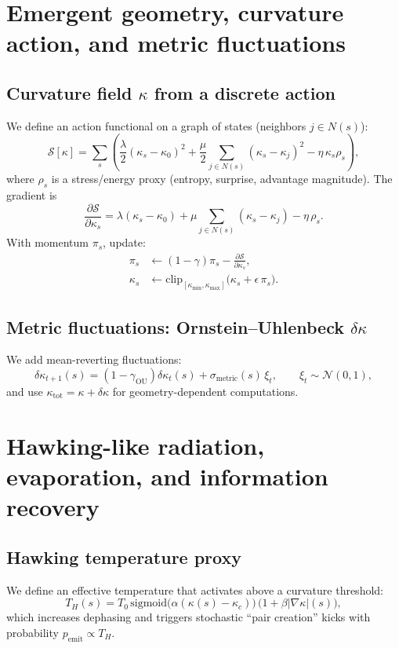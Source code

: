 \documentclass[11pt]{article}
\newcommand{\sigmoid}{\mathrm{sigmoid}}
\newcommand{\clip}{\mathrm{clip}}
\begin{document}
\section{Emergent geometry, curvature action, and metric fluctuations}
\label{sec:geometry}
\subsection{Curvature field $\kappa$ from a discrete action}
We define an action functional on a graph of states (neighbors $j\in N(s)$):
\begin{equation}
\mathcal{S}[\kappa]=\sum_s \left(\frac{\lambda}{2}(\kappa_s-\kappa_0)^2 + \frac{\mu}{2}\sum_{j\in N(s)}(\kappa_s-\kappa_j)^2 - \eta\,\kappa_s \rho_s\right),
\end{equation}
where $\rho_s$ is a stress/energy proxy (entropy, surprise, advantage magnitude). The gradient is
\begin{equation}
\frac{\partial \mathcal{S}}{\partial \kappa_s}=\lambda(\kappa_s-\kappa_0)+\mu\sum_{j\in N(s)}(\kappa_s-\kappa_j)-\eta\,\rho_s.
\end{equation}
With momentum $\pi_s$, update:
\begin{align}
\pi_s &\leftarrow (1-\gamma)\pi_s - \frac{\partial \mathcal{S}}{\partial \kappa_s},\\
\kappa_s &\leftarrow \clip_{[\kappa_{\min},\kappa_{\max}]}\big(\kappa_s + \epsilon\,\pi_s\big).
\end{align}

\subsection{Metric fluctuations: Ornstein--Uhlenbeck $\delta\kappa$}
We add mean-reverting fluctuations:
\begin{equation}
\delta\kappa_{t+1}(s) = (1-\gamma_{\mathrm{OU}})\delta\kappa_t(s) + \sigma_{\mathrm{metric}}(s)\,\xi_t,\qquad \xi_t\sim \mathcal{N}(0,1),
\end{equation}
and use $\kappa_{\mathrm{tot}}=\kappa+\delta\kappa$ for geometry-dependent computations.

\section{Hawking-like radiation, evaporation, and information recovery}
\label{sec:hawking}
\subsection{Hawking temperature proxy}
We define an effective temperature that activates above a curvature threshold:
\begin{equation}
T_H(s)=T_0\, \sigmoid\big(\alpha(\kappa(s)-\kappa_c)\big)\,\big(1+\beta |\nabla \kappa|(s)\big),
\end{equation}
which increases dephasing and triggers stochastic ``pair creation'' kicks with probability $p_{\mathrm{emit}}\propto T_H$.
\end{document}
